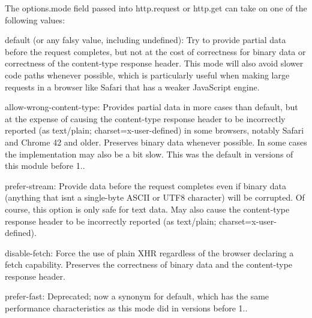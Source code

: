 \begin{DoxyItemize}
\item The {\ttfamily options.\+mode} field passed into {\ttfamily http.\+request} or {\ttfamily http.\+get} can take on one of the following values\+:
\begin{DoxyItemize}
\item \textquotesingle{}default\textquotesingle{} (or any falsy value, including {\ttfamily undefined})\+: Try to provide partial data before the request completes, but not at the cost of correctness for binary data or correctness of the \textquotesingle{}content-\/type\textquotesingle{} response header. This mode will also avoid slower code paths whenever possible, which is particularly useful when making large requests in a browser like Safari that has a weaker Java\+Script engine.
\item \textquotesingle{}allow-\/wrong-\/content-\/type\textquotesingle{}\+: Provides partial data in more cases than \textquotesingle{}default\textquotesingle{}, but at the expense of causing the \textquotesingle{}content-\/type\textquotesingle{} response header to be incorrectly reported (as \textquotesingle{}text/plain; charset=x-\/user-\/defined\textquotesingle{}) in some browsers, notably Safari and Chrome 42 and older. Preserves binary data whenever possible. In some cases the implementation may also be a bit slow. This was the default in versions of this module before 1..
\item \textquotesingle{}prefer-\/stream\textquotesingle{}\+: Provide data before the request completes even if binary data (anything that isn\textquotesingle{}t a single-\/byte A\+S\+C\+II or U\+T\+F8 character) will be corrupted. Of course, this option is only safe for text data. May also cause the \textquotesingle{}content-\/type\textquotesingle{} response header to be incorrectly reported (as \textquotesingle{}text/plain; charset=x-\/user-\/defined\textquotesingle{}).
\item \textquotesingle{}disable-\/fetch\textquotesingle{}\+: Force the use of plain X\+HR regardless of the browser declaring a fetch capability. Preserves the correctness of binary data and the \textquotesingle{}content-\/type\textquotesingle{} response header.
\item \textquotesingle{}prefer-\/fast\textquotesingle{}\+: Deprecated; now a synonym for \textquotesingle{}default\textquotesingle{}, which has the same performance characteristics as this mode did in versions before 1..
\end{DoxyItemize}
\end{DoxyItemize}

